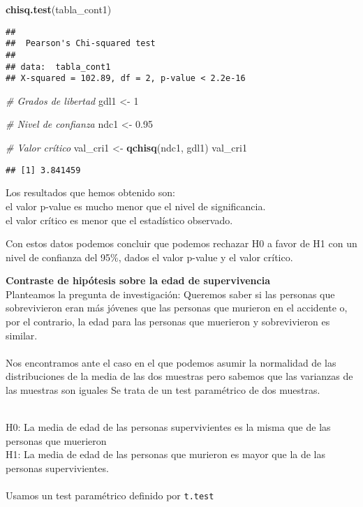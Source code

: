 \documentclass[
]{article}
\newenvironment{Shaded}{\begin{snugshade}}{\end{snugshade}}
\newcommand{\CommentTok}[1]{\textcolor[rgb]{0.56,0.35,0.01}{\textit{#1}}}
\newcommand{\DecValTok}[1]{\textcolor[rgb]{0.00,0.00,0.81}{#1}}
\newcommand{\FloatTok}[1]{\textcolor[rgb]{0.00,0.00,0.81}{#1}}
\newcommand{\KeywordTok}[1]{\textcolor[rgb]{0.13,0.29,0.53}{\textbf{#1}}}
\newcommand{\NormalTok}[1]{#1}
\newcommand{\StringTok}[1]{\textcolor[rgb]{0.31,0.60,0.02}{#1}}
\begin{document}
\begin{Shaded}
\begin{Highlighting}[]
\KeywordTok{chisq.test}\NormalTok{(tabla_cont1)}
\end{Highlighting}
\end{Shaded}

\begin{verbatim}
## 
##  Pearson's Chi-squared test
## 
## data:  tabla_cont1
## X-squared = 102.89, df = 2, p-value < 2.2e-16
\end{verbatim}

\begin{Shaded}
\begin{Highlighting}[]
\CommentTok{# Grados de libertad}
\NormalTok{gdl1 <-}\StringTok{ }\DecValTok{1}  

\CommentTok{# Nivel de confianza}
\NormalTok{ndc1 <-}\StringTok{ }\FloatTok{0.95}

\CommentTok{# Valor crítico}
\NormalTok{val_cri1 <-}\StringTok{ }\KeywordTok{qchisq}\NormalTok{(ndc1, gdl1)}
\NormalTok{val_cri1}
\end{Highlighting}
\end{Shaded}

\begin{verbatim}
## [1] 3.841459
\end{verbatim}

Los resultados que hemos obtenido son:\\
el valor p-value es mucho menor que el nivel de significancia.\\
el valor crítico es menor que el estadístico observado.

Con estos datos podemos concluir que podemos rechazar H0 a favor de H1
con un nivel de confianza del 95\%, dados el valor p-value y el valor
crítico.

\textbf{Contraste de hipótesis sobre la edad de supervivencia}
\texttt{}\\
Planteamos la pregunta de investigación: Queremos saber si las personas
que sobrevivieron eran más jóvenes que las personas que murieron en el
accidente o, por el contrario, la edad para las personas que muerieron y
sobrevivieron es similar.\\
\texttt{}~\\
Nos encontramos ante el caso en el que podemos asumir la normalidad de
las distribuciones de la media de las dos muestras pero sabemos que las
varianzas de las muestras son iguales Se trata de un test paramétrico de
dos muestras.

\texttt{}\\
H0: La media de edad de las personas supervivientes es la misma que de
las personas que muerieron\\
H1: La media de edad de las personas que murieron es mayor que la de las
personas supervivientes.\\
\texttt{}~\\
Usamos un test paramétrico definido por \texttt{t.test} \texttt{}
\end{document}
